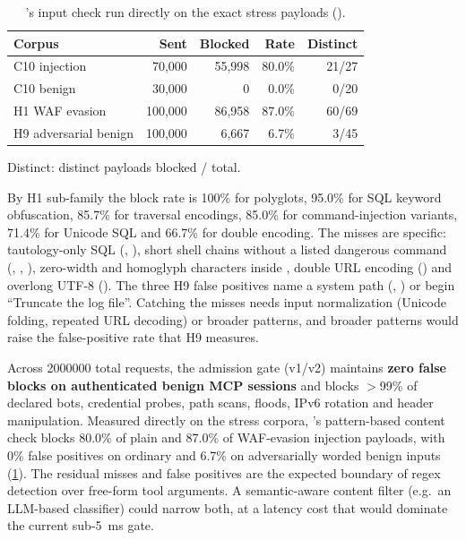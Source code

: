 \documentclass[10pt,twocolumn]{article}
\begin{document}
\begin{table}[t]
\centering\small
\caption{\bastion{}'s input check run directly on the exact stress payloads
().}
\label{tab:bastiondirect}
\begin{tabularx}{\columnwidth}{@{}X r r r r@{}}
\toprule
Corpus & Sent & Blocked & Rate & Distinct \\
\midrule
C10 injection   & 70,000  & 55,998 & 80.0\% & 21/27 \\
C10 benign      & 30,000  & 0      & 0.0\%  & 0/20 \\
H1 WAF evasion  & 100,000 & 86,958 & 87.0\% & 60/69 \\
H9 adversarial benign & 100,000 & 6,667 & 6.7\% & 3/45 \\
\bottomrule
\end{tabularx}
\par\smallskip\footnotesize Distinct: distinct payloads blocked / total.
\end{table}

By H1 sub-family the block rate is 100\% for polyglots, 95.0\% for SQL
keyword obfuscation, 85.7\% for traversal encodings, 85.0\% for
command-injection variants, 71.4\% for Unicode SQL and 66.7\% for double
encoding. The misses are specific: tautology-only SQL (,
), short shell chains without a listed dangerous command
(, , ), zero-width and
homoglyph characters inside , double URL encoding ()
and overlong UTF-8 (). The three H9 false positives name a
system path (, ) or begin ``Truncate
the log file''. Catching the misses needs input normalization (Unicode
folding, repeated URL decoding) or broader patterns, and broader patterns
would raise the false-positive rate that H9 measures.

Across \num{2000000} total requests, the admission gate (v1/v2) maintains
\textbf{zero false blocks on authenticated benign MCP sessions} and blocks
$>$99\% of declared bots, credential probes, path scans, floods, IPv6
rotation and header manipulation. Measured directly on the stress corpora,
\bastion{}'s pattern-based content check blocks 80.0\% of plain and 87.0\%
of WAF-evasion injection payloads, with 0\% false positives on ordinary and
6.7\% on adversarially worded benign inputs (\cref{tab:bastiondirect}). The
residual misses and false positives are the expected boundary of regex
detection over free-form tool arguments. A semantic-aware content filter
(e.g.\ an LLM-based classifier) could narrow both, at a latency cost that
would dominate the current sub-\SI{5}{ms} gate.
\end{document}
